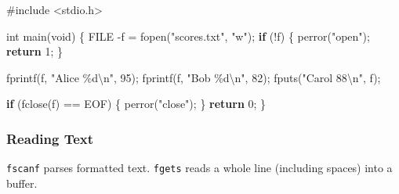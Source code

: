 \documentclass[
  letterpaper,
  DIV=11,
  numbers=noendperiod]{scrreprt}
\newenvironment{Shaded}{\begin{snugshade}}{\end{snugshade}}
\newcommand{\ControlFlowTok}[1]{\textcolor[rgb]{0.00,0.23,0.31}{\textbf{#1}}}
\newcommand{\DataTypeTok}[1]{\textcolor[rgb]{0.68,0.00,0.00}{#1}}
\newcommand{\DecValTok}[1]{\textcolor[rgb]{0.68,0.00,0.00}{#1}}
\newcommand{\ImportTok}[1]{\textcolor[rgb]{0.00,0.46,0.62}{#1}}
\newcommand{\NormalTok}[1]{\textcolor[rgb]{0.00,0.23,0.31}{#1}}
\newcommand{\OperatorTok}[1]{\textcolor[rgb]{0.37,0.37,0.37}{#1}}
\newcommand{\PreprocessorTok}[1]{\textcolor[rgb]{0.68,0.00,0.00}{#1}}
\newcommand{\SpecialCharTok}[1]{\textcolor[rgb]{0.37,0.37,0.37}{#1}}
\newcommand{\StringTok}[1]{\textcolor[rgb]{0.13,0.47,0.30}{#1}}
\begin{document}
\begin{Shaded}
\begin{Highlighting}[]
\PreprocessorTok{\#include }\ImportTok{\textless{}stdio.h\textgreater{}}

\DataTypeTok{int}\NormalTok{ main}\OperatorTok{(}\DataTypeTok{void}\OperatorTok{)} \OperatorTok{\{}
    \DataTypeTok{FILE} \OperatorTok{{-}}\NormalTok{f }\OperatorTok{=}\NormalTok{ fopen}\OperatorTok{(}\StringTok{"scores.txt"}\OperatorTok{,} \StringTok{"w"}\OperatorTok{);}
    \ControlFlowTok{if} \OperatorTok{(!}\NormalTok{f}\OperatorTok{)} \OperatorTok{\{}\NormalTok{ perror}\OperatorTok{(}\StringTok{"open"}\OperatorTok{);} \ControlFlowTok{return} \DecValTok{1}\OperatorTok{;} \OperatorTok{\}}

\NormalTok{    fprintf}\OperatorTok{(}\NormalTok{f}\OperatorTok{,} \StringTok{"Alice }\SpecialCharTok{\%d\textbackslash{}n}\StringTok{"}\OperatorTok{,} \DecValTok{95}\OperatorTok{);}
\NormalTok{    fprintf}\OperatorTok{(}\NormalTok{f}\OperatorTok{,} \StringTok{"Bob }\SpecialCharTok{\%d\textbackslash{}n}\StringTok{"}\OperatorTok{,}   \DecValTok{82}\OperatorTok{);}
\NormalTok{    fputs}\OperatorTok{(}\StringTok{"Carol 88}\SpecialCharTok{\textbackslash{}n}\StringTok{"}\OperatorTok{,}\NormalTok{ f}\OperatorTok{);}

    \ControlFlowTok{if} \OperatorTok{(}\NormalTok{fclose}\OperatorTok{(}\NormalTok{f}\OperatorTok{)} \OperatorTok{==}\NormalTok{ EOF}\OperatorTok{)} \OperatorTok{\{}\NormalTok{ perror}\OperatorTok{(}\StringTok{"close"}\OperatorTok{);} \OperatorTok{\}}
    \ControlFlowTok{return} \DecValTok{0}\OperatorTok{;}
\OperatorTok{\}}
\end{Highlighting}
\end{Shaded}

\subsubsection{Reading Text}\label{reading-text}

\texttt{fscanf} parses formatted text. \texttt{fgets} reads a whole line
(including spaces) into a buffer.
\end{document}
